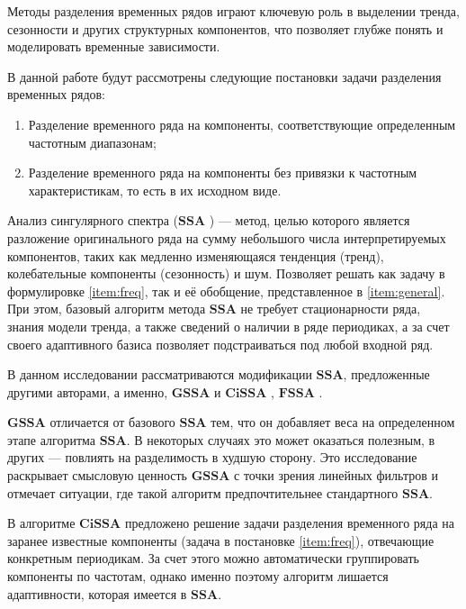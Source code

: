 \documentclass[a4paper, 11pt]{article}
\newcommand{\SSA}{\textbf{SSA}}
\newcommand{\GSSA}{\textbf{GSSA}}
\newcommand{\CISSA}{\textbf{CiSSA}}
\newcommand{\FSSA}{\textbf{FSSA}}
\newcommand{\TS}{\mathsf{X}}
\newtheorem{comment}{Замечание} %
\begin{document}

Методы разделения временных рядов играют ключевую роль в выделении тренда, сезонности и других структурных компонентов, что позволяет глубже понять и моделировать временные зависимости.


В данной работе будут рассмотрены следующие постановки задачи разделения временных рядов:
\begin{enumerate}
	\item \label{item:freq} Разделение временного ряда на компоненты, соответствующие определенным частотным диапазонам;
	\item \label{item:general} Разделение временного ряда на компоненты без привязки к частотным характеристикам, то есть в их исходном виде.
\end{enumerate}


Анализ сингулярного спектра ($\SSA$ \cite{golyandina2001analysis}) --- метод, целью которого является разложение оригинального ряда на сумму небольшого числа интерпретируемых компонентов, таких как медленно изменяющаяся тенденция (тренд), колебательные компоненты (сезонность) и шум. Позволяет решать как задачу в формулировке \ref{item:freq}, так и её обобщение, представленное в \ref{item:general}. При этом, базовый алгоритм метода $\SSA$ не требует стационарности ряда, знания модели тренда, а также сведений о наличии в ряде периодиках, а за счет своего адаптивного базиса позволяет подстраиваться под любой входной ряд.

В данном исследовании рассматриваются модификации $\SSA$, предложенные другими авторами, а именно, $\GSSA$ \cite{gu2024generalized} и $\CISSA$ \cite{bogalo2020}, $\FSSA$ \cite{haghbin2019functionalsingularspectrumanalysis}.


$\GSSA$ отличается от базового $\SSA$ тем, что он добавляет веса на определенном этапе алгоритма $\SSA$. В некоторых случаях это может оказаться полезным, в других --- повлиять на разделимость в худшую сторону.
Это исследование раскрывает смысловую ценность $\GSSA$ с точки зрения линейных фильтров и отмечает ситуации, где такой алгоритм предпочтительнее стандартного $\SSA$.


В алгоритме $\CISSA$ предложено решение задачи разделения временного ряда на заранее известные компоненты (задача в постановке \ref{item:freq}), отвечающие конкретным периодикам. За счет этого можно автоматически группировать компоненты по частотам, однако именно поэтому алгоритм лишается адаптивности, которая имеется в $\SSA$.
\end{document}
